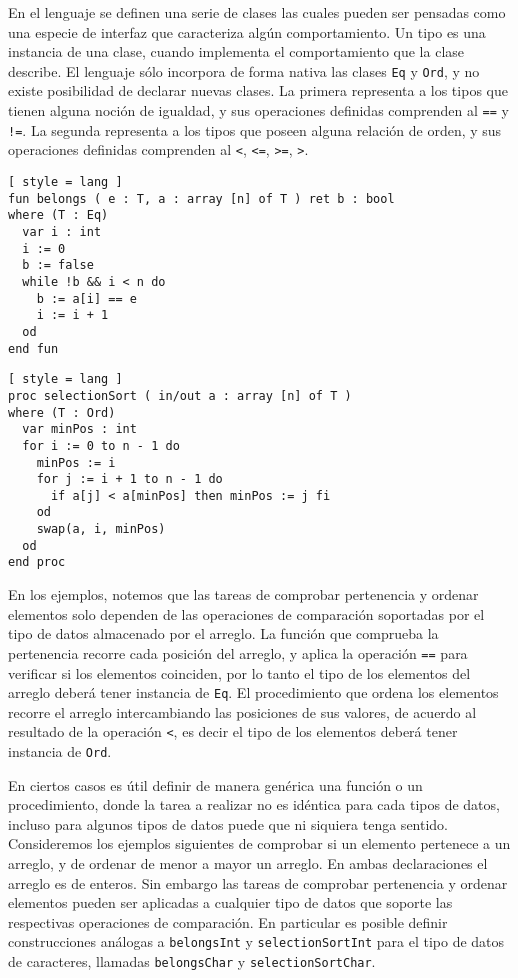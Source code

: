 En el lenguaje se definen una serie de clases las cuales pueden ser pensadas como una especie de interfaz que caracteriza algún comportamiento.
Un tipo es una instancia de una clase, cuando implementa el comportamiento que la clase describe.
El lenguaje sólo incorpora de forma nativa las clases \lstinline[style = lang]{Eq} y \lstinline[style = lang]{Ord}, y no existe posibilidad de declarar nuevas clases.
La primera representa a los tipos que tienen alguna noción de igualdad, y sus operaciones definidas comprenden al \lstinline[style = lang]{==} y \lstinline[style = lang]{!=}.
La segunda representa a los tipos que poseen alguna relación de orden, y sus operaciones definidas comprenden al \lstinline[style = lang]{<}, \lstinline[style = lang]{<=}, \lstinline[style = lang]{>=}, \lstinline[style = lang]{>}.

\begin{lstlisting}[ style = lang ]
fun belongs ( e : T, a : array [n] of T ) ret b : bool
where (T : Eq)
  var i : int
  i := 0
  b := false
  while !b && i < n do
    b := a[i] == e
    i := i + 1
  od
end fun
\end{lstlisting}

\begin{lstlisting}[ style = lang ]
proc selectionSort ( in/out a : array [n] of T )
where (T : Ord)
  var minPos : int
  for i := 0 to n - 1 do
    minPos := i
    for j := i + 1 to n - 1 do
      if a[j] < a[minPos] then minPos := j fi
    od
    swap(a, i, minPos)
  od
end proc
\end{lstlisting}

En los ejemplos, notemos que las tareas de comprobar pertenencia y ordenar elementos solo dependen de las operaciones de comparación soportadas por el tipo de datos almacenado por el arreglo.
La función que comprueba la pertenencia recorre cada posición del arreglo, y aplica la operación \lstinline[style = lang]{==} para verificar si los elementos coinciden, por lo tanto el tipo de los elementos del arreglo deberá tener instancia de \lstinline[style = lang]{Eq}.
El procedimiento que ordena los elementos recorre el arreglo intercambiando las posiciones de sus valores, de acuerdo al resultado de la operación \lstinline[style = lang]{<}, es decir el tipo de los elementos deberá tener instancia de \lstinline[style = lang]{Ord}.

\iffalse
En ciertos casos es útil definir de manera genérica una función o un procedimiento, donde la tarea a realizar no es idéntica para cada tipos de datos, incluso para algunos tipos de datos puede que ni siquiera tenga sentido.
Consideremos los ejemplos siguientes de comprobar si un elemento pertenece a un arreglo, y de ordenar de menor a mayor un arreglo.
En ambas declaraciones el arreglo es de enteros.
Sin embargo las tareas de comprobar pertenencia y ordenar elementos pueden ser aplicadas a cualquier tipo de datos que soporte las respectivas operaciones de comparación.
En particular es posible definir construcciones análogas a \lstinline[style = lang]{belongsInt} y \lstinline[style = lang]{selectionSortInt} para el tipo de datos de caracteres, llamadas \lstinline[style = lang]{belongsChar} y \lstinline[style = lang]{selectionSortChar}.

